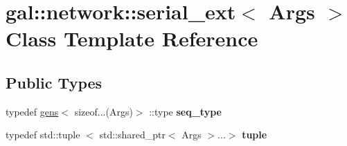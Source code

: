 \hypertarget{classgal_1_1network_1_1serial__ext}{\section{gal\-:\-:network\-:\-:serial\-\_\-ext$<$ \-Args $>$ \-Class \-Template \-Reference}
\label{classgal_1_1network_1_1serial__ext}
}
\subsection*{\-Public \-Types}
\begin{DoxyCompactItemize}
\item 
\hypertarget{classgal_1_1network_1_1serial__ext_a67ab3df55041b1a29a039223d45575f4}{typedef \hyperlink{structgens}{gens}$<$ sizeof...(\-Args)$>$\*
\-::type {\bfseries seq\-\_\-type}}\label{classgal_1_1network_1_1serial__ext_a67ab3df55041b1a29a039223d45575f4}

\item 
\hypertarget{classgal_1_1network_1_1serial__ext_a41bae0b2f8a46739862abc99ef1a135e}{typedef std\-::tuple\*
$<$ std\-::shared\-\_\-ptr$<$ \-Args $>$...$>$ {\bfseries tuple}}\label{classgal_1_1network_1_1serial__ext_a41bae0b2f8a46739862abc99ef1a135e}

\end{DoxyCompactItemize}
